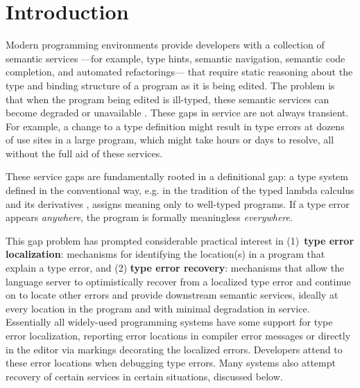 \section{Introduction}
\label{sec:introduction}


Modern programming environments provide developers with a collection of semantic services%
---for example, type hints, semantic navigation, semantic code completion, and automated refactorings---%
that require static reasoning about the type and binding structure of a program as it is being edited. 
The problem is that when the program being edited is ill-typed, 
these semantic services can become degraded or unavailable \cite{HazelnutSNAPL}. 
These gaps in service are not always transient. 
For example, a change to a type definition might result in type errors at dozens of use sites in a large program, which might take hours or days to resolve, all without the full aid of these services.

These service gaps are fundamentally rooted in a definitional gap: a type system defined in the conventional way, 
e.g. in the tradition of the typed lambda calculus and its derivatives \cite{TaplBook,pfpl},
assigns meaning only to well-typed programs. 
If a type error appears \emph{anywhere}, the program is formally meaningless \emph{everywhere}.

This gap problem has prompted considerable practical interest in 
(1)~\textbf{type error localization}: mechanisms for identifying the location(s) in a program that explain a type error, and 
(2) \textbf{type error recovery}: mechanisms that allow the language server to optimistically recover from a localized type error 
and continue on to locate other errors and provide downstream semantic services, 
ideally at every location in the program and with minimal degradation in service.
Essentially all widely-used programming systems have some support for type error localization, 
reporting error locations in compiler error messages 
or directly in the editor via markings decorating the localized errors. Developers attend to these error locations when debugging type errors.
Many systems also attempt recovery of certain services in certain situations, discussed below.


